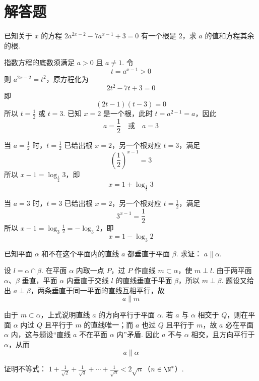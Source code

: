 \section{解答题}

\begin{problem}
已知关于 \(x\) 的方程 \(2a^{2x-2}-7a^{x-1}+3=0\) 有一个根是 \(2\)，求 \(a\) 的值和方程其余的根.
\end{problem}

\begin{solution}
指数方程的底数须满足 \(a>0\) 且 \(a\ne1\). 令
\[
t=a^{x-1}>0
\]
则 \(a^{2x-2}=t^2\)，原方程化为
\[
2t^2-7t+3=0
\]
即
\[
(2t-1)(t-3)=0
\]
所以 \(t=\frac12\) 或 \(t=3\). 已知 \(x=2\) 是一个根，此时 \(t=a^{2-1}=a\)，因此
\[
a=\frac12\quad\text{或}\quad a=3
\]

当 \(a=\frac12\) 时，\(t=\frac12\) 已给出根 \(x=2\)，另一个根对应 \(t=3\)，满足
\[
\left(\frac12\right)^{x-1}=3
\]
所以 \(x-1=\log_{\frac12}3\)，即
\[
x=1+\log_{\frac12}3
\]

当 \(a=3\) 时，\(t=3\) 已给出根 \(x=2\)，另一个根对应 \(t=\frac12\)，满足
\[
3^{x-1}=\frac12
\]
所以 \(x-1=\log_3\frac12=-\log_3 2\)，即
\[
x=1-\log_3 2
\]
\end{solution}

\begin{problem}
已知平面 \(\alpha\) 和不在这个平面内的直线 \(a\) 都垂直于平面 \(\beta\). 求证： \(a\parallel \alpha\).
\end{problem}

\begin{solution}
设 \(l=\alpha\cap\beta\). 在平面 \(\alpha\) 内取一点 \(P\)，过 \(P\) 作直线 \(m\subset\alpha\)，使 \(m\perp l\). 由于两平面 \(\alpha\)、\(\beta\) 垂直，平面 \(\alpha\) 内垂直于交线 \(l\) 的直线垂直于平面 \(\beta\)，所以 \(m\perp\beta\). 题设又给出 \(a\perp\beta\)，两条垂直于同一平面的直线互相平行，故
\[
a\parallel m
\]

由于 \(m\subset\alpha\)，上式说明直线 \(a\) 的方向平行于平面 \(\alpha\). 若 \(a\) 与 \(\alpha\) 相交于 \(Q\)，则在平面 \(\alpha\) 内过 \(Q\) 且平行于 \(m\) 的直线唯一；而 \(a\) 也过 \(Q\) 且平行于 \(m\)，故 \(a\) 必在平面 \(\alpha\) 内，这与题设“直线 \(a\) 不在平面 \(\alpha\) 内”矛盾. 因此 \(a\) 不与 \(\alpha\) 相交，且方向平行于 \(\alpha\)，从而
\[
a\parallel\alpha
\]
\end{solution}

\begin{problem}
证明不等式： \(1+\frac{1}{\sqrt{2}}+\frac{1}{\sqrt{3}}+\cdots+\frac{1}{\sqrt{n}}<2\sqrt{n}\)（\(n\in \N^*\)）.
\end{problem}

